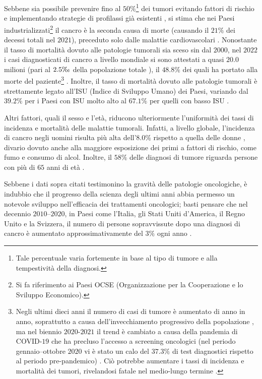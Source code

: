 \documentclass[12pt,a4paper,twoside]{report}
\begin{document}
	Sebbene sia possibile prevenire fino al $50\%$\footnote{Tale percentuale varia fortemente in base al tipo di tumore e alla tempestività della diagnosi.} dei tumori evitando fattori di rischio e implementando strategie di profilassi già esistenti \cite{who}, si stima che nei Paesi industrializzati\footnote{Si fa riferimento ai Paesi OCSE (Organizzazione per la Cooperazione e lo Sviluppo Economico).} il cancro è la seconda causa di morte (causando il $21\%$ dei decessi totali nel $2021$), preceduto solo dalle malattie cardiovascolari \cite{oecd2023}. Nonostante il tasso di mortalità dovuto alle patologie tumorali sia sceso sin dal $2000$, nel $2022$ i casi diagnosticati di cancro a livello mondiale si sono attestati a quasi $20.0$ milioni (pari al $2.5\tcperthousand$ della popolazione totale \cite{unicef2022}), il $48.8\%$ dei quali ha portato alla morte del paziente\footnote{Negli ultimi dieci anni il numero di casi di tumore è aumentato di anno in anno, soprattutto a causa dell'invecchiamento progressivo della popolazione \cite{De_Angelis2024-no}, ma nel biennio $2020$-$2021$ il trend è cambiato a causa della pandemia di COVID-$19$ che ha precluso l'accesso a screening oncologici (nel periodo gennaio--ottobre $2020$ vi è stato un calo del $37.3\%$ di test diagnostici rispetto al periodo pre-pandemico) \cite{Angelini2023-xc}. Ciò potrebbe aumentare i tassi di incidenza e mortalità dei tumori, rivelandosi fatale nel medio-lungo termine \cite{oecd2021}.} \cite{gco}. Inoltre, il tasso di mortalità dovuto alle patologie tumorali è strettamente legato all'ISU (Indice di Sviluppo Umano) dei Paesi, variando dal $39.2\%$ per i Paesi con ISU molto alto al $67.1\%$ per quelli con basso ISU \cite{gco}.
	
	Altri fattori, quali il sesso e l'età, riducono ulteriormente l'uniformità dei tassi di incidenza e mortalità delle malattie tumorali. Infatti, a livello globale, l'incidenza di cancro negli uomini risulta più alta dell'$8.0\%$ rispetto a quella delle donne \cite{gco2}, divario dovuto anche alla maggiore esposizione dei primi a fattori di rischio, come fumo e consumo di alcol. Inoltre, il $58\%$ delle diagnosi di tumore riguarda persone con più di $65$ anni di età \cite{uscs}.
	
	Sebbene i dati sopra citati testimonino la gravità delle patologie oncologiche, è indubbio che il progresso della scienza degli ultimi anni abbia permesso un notevole sviluppo nell'efficacia dei trattamenti oncologici; basti pensare che nel decennio $2010$--$2020$, in Paesi come l'Italia, gli Stati Uniti d'America, il Regno Unito e la Svizzera, il numero di persone sopravvissute dopo una diagnosi di cancro è aumentato approssimativamente del $3\%$ ogni anno \cite{Guzzinati2018-sf}.
	
\end{document}
